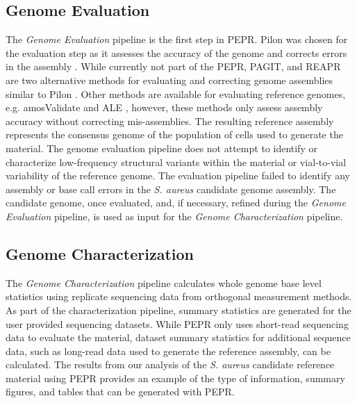 \documentclass[smallextended]{svjour3}\usepackage[]{graphicx}\usepackage[]{color}
\begin{document}
\subsection{Genome Evaluation}
The \textit{Genome Evaluation} pipeline is the first step in PEPR. 
Pilon was chosen for the evaluation step as it assesses the accuracy of the genome and corrects errors in the assembly \cite{Walker2014}. 
While currently not part of the PEPR, PAGIT, and REAPR are two alternative methods for evaluating and correcting genome assemblies similar to Pilon \cite{Swain2012,Hunt2013}. 
Other methods are available for evaluating reference genomes, e.g. amosValidate \cite{Phillippy2008} and ALE \cite{Clark2013}, however, these methods only assess assembly accuracy without correcting mis-assemblies. 
The resulting reference assembly represents the consensus genome of the population of cells used to generate the material. 
The genome evaluation pipeline does not attempt to identify or characterize low-frequency structural variants within the material or vial-to-vial variability of the reference genome. 
The evaluation pipeline failed to identify any assembly or base call errors in the \textit{S. aureus} candidate genome assembly. 
The candidate genome, once evaluated, and, if necessary, refined during the \textit{Genome Evaluation} pipeline, is used as input for the \textit{Genome Characterization} pipeline. 


\subsection{Genome Characterization}
The \textit{Genome Characterization} pipeline calculates whole genome base level statistics using replicate sequencing data from orthogonal measurement methods. 
As part of the characterization pipeline, summary statistics are generated for the user provided sequencing datasets. 
While PEPR only uses short-read sequencing data to evaluate the material, dataset summary statistics for additional sequence data, such as long-read data used to generate the reference assembly, can be calculated.  
The results from our analysis of the \textit{S. aureus} candidate reference material using PEPR provides an example of the type of information, summary figures, and tables that can be generated with PEPR.
\end{document}
